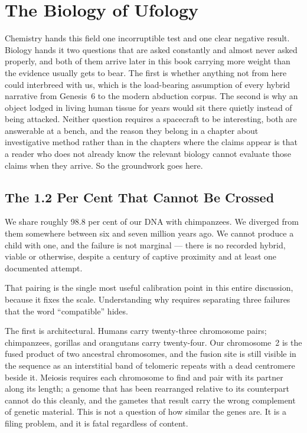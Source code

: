 \section{The Biology of Ufology}\label{sec:biologyufology}

Chemistry hands this field one incorruptible test and one clear negative result. Biology hands it
two questions that are asked constantly and almost never asked properly, and both of them arrive
later in this book carrying more weight than the evidence usually gets to bear. The first is
whether anything not from here could interbreed with us, which is the load-bearing assumption of
every hybrid narrative from Genesis~6 to the modern abduction corpus. The second is why an object
lodged in living human tissue for years would sit there quietly instead of being attacked. Neither
question requires a spacecraft to be interesting, both are answerable at a bench, and the reason
they belong in a chapter about investigative method rather than in the chapters where the claims
appear is that a reader who does not already know the relevant biology cannot evaluate those claims
when they arrive. So the groundwork goes here.

\subsection{The 1.2 Per Cent That Cannot Be Crossed}

We share roughly 98.8 per cent of our DNA with chimpanzees. We diverged from them somewhere
between six and seven million years ago. We cannot produce a child with one, and the failure is
not marginal --- there is no recorded hybrid, viable or otherwise, despite a century of captive
proximity and at least one documented attempt.

That pairing is the single most useful calibration point in this entire discussion, because it
fixes the scale.  Understanding
why requires separating three failures that the word ``compatible'' hides.

The first is architectural. Humans carry twenty-three chromosome pairs; chimpanzees, gorillas and
orangutans carry twenty-four. Our chromosome~2 is the fused product of two ancestral chromosomes,
and the fusion site is still visible in the sequence as an interstitial band of telomeric repeats
with a dead centromere beside it. Meiosis requires each chromosome to find and pair with its
partner along its length; a genome that has been rearranged relative to its counterpart cannot do
this cleanly, and the gametes that result carry the wrong complement of genetic material. This is
not a question of how similar the genes are. It is a filing problem, and it is fatal regardless of
content.


